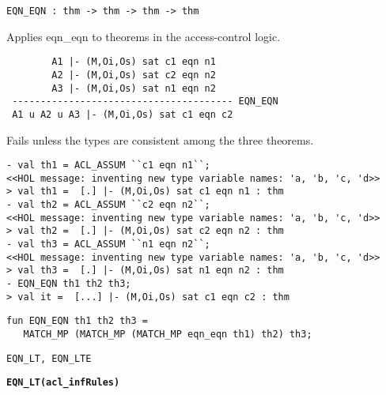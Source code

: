 \begin{verbatim}
EQN_EQN : thm -> thm -> thm -> thm
\end{verbatim}

\SYNOPSIS
Applies eqn\_eqn to theorems in the access-control logic.

\DESCRIBE
\begin{verbatim}
        A1 |- (M,Oi,Os) sat c1 eqn n1
        A2 |- (M,Oi,Os) sat c2 eqn n2  
        A3 |- (M,Oi,Os) sat n1 eqn n2
 --------------------------------------- EQN_EQN
 A1 u A2 u A3 |- (M,Oi,Os) sat c1 eqn c2
\end{verbatim}

\FAILURE Fails unless the types are consistent among the three
theorems.

\EXAMPLE
\begin{holboxed}
\begin{verbatim}
- val th1 = ACL_ASSUM ``c1 eqn n1``;
<<HOL message: inventing new type variable names: 'a, 'b, 'c, 'd>>
> val th1 =  [.] |- (M,Oi,Os) sat c1 eqn n1 : thm
- val th2 = ACL_ASSUM ``c2 eqn n2``;
<<HOL message: inventing new type variable names: 'a, 'b, 'c, 'd>>
> val th2 =  [.] |- (M,Oi,Os) sat c2 eqn n2 : thm
- val th3 = ACL_ASSUM ``n1 eqn n2``;
<<HOL message: inventing new type variable names: 'a, 'b, 'c, 'd>>
> val th3 =  [.] |- (M,Oi,Os) sat n1 eqn n2 : thm
- EQN_EQN th1 th2 th3;
> val it =  [...] |- (M,Oi,Os) sat c1 eqn c2 : thm
\end{verbatim}
\end{holboxed}

\IMPLEMENTATION
\begin{holboxed}
\begin{verbatim}
fun EQN_EQN th1 th2 th3 =
   MATCH_MP (MATCH_MP (MATCH_MP eqn_eqn th1) th2) th3;
\end{verbatim}
\end{holboxed}

\SEEALSO
\texttt{EQN\_LT, EQN\_LTE}
\ENDDOC



\begin{holboxed}
  \begin{Large}
    \textbf{\texttt{EQN\_LT}}\hfill{}\textbf{\texttt{(acl\_infRules)}}
  \end{Large}
\end{holboxed}

